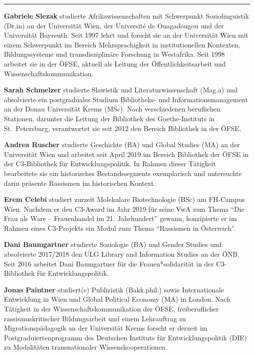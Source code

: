 \begin{center}\rule{0.5\linewidth}{0.5pt}\end{center}

\textbf{Gabriele Slezak} studierte Afrikawissenschaften mit Schwerpunkt
Soziolinguistik (Dr.in) an der Universität Wien, der Université de
Ouagadougou und der Universität Bayreuth. Seit 1997 lehrt und forscht
sie an der Universität Wien mit einem Schwerpunkt im Bereich
Mehrsprachigkeit in institutionellen Kontexten, Bildungssysteme und
transdisziplinäre Forschung in Westafrika. Seit 1998 arbeitet sie in der
ÖFSE, aktuell als Leitung der Öffentlichkeitsarbeit und
Wissenschaftskommunikation.

\textbf{Sarah Schmelzer} studierte Slawistik und Literaturwissenschaft
(Mag.a) und absolvierte ein postgraduales Studium Bibliotheks- und
Informationsmanagement an der Donau Universität Krems (MSc). Nach
verschiedenen beruflichen Stationen, darunter die Leitung der Bibliothek
des Goethe-Instituts in St.~Petersburg, verantwortet sie seit 2012 den
Bereich Bibliothek in der ÖFSE.

\textbf{Andrea Ruscher} studierte Geschichte (BA) und Global Studies
(MA) an der Universität Wien und arbeitet seit April 2019 im Bereich
Bibliothek der ÖFSE in der C3-Bibliothek für Entwicklungspolitik. In
Rahmen dieser Tätigkeit bearbeitete sie ein historisches
Bestandssegments exemplarisch und untersuchte darin präsente Rassismen
im historischen Kontext.

\textbf{Erem Celebi} studiert zurzeit Molekulare Biotechnologie (BSc) am
FH-Campus Wien. Nachdem er den C3-Award im Jahr 2019 für seine VwA zum
Thema \enquote{Die Frau als Ware -- Frauenhandel im 21. Jahrhundert} gewann,
konzipierte er im Rahmen eines C3-Projekts ein Modul zum Thema
\enquote{Rassismen in Österreich}.

\textbf{Dani Baumgartner} studierte Soziologie (BA) und Gender Studies
und absolvierte 2017/2018 den ULG Library and Information Studies an der
ÖNB. Seit 2016 arbeitet Dani Baumgartner für die Frauen*solidarität in
der C3-Bibliothek für Entwicklungspolitik.

\textbf{Jonas Paintner} studiert(e) Publizistik (Bakk.phil.) sowie
Internationale Entwicklung in Wien und Global Political Economy (MA) in
London. Nach Tätigkeit in der Wissenschaftskommunikation der ÖFSE,
freiberuflicher rassismuskritischer Bildungsarbeit und einem Lehrauftrag
zu Migrationspädagogik an der Universität Krems forscht er derzeit im
Postgraduiertenprogramm des Deutschen Instituts für Entwicklungspolitik
(DIE) zu Modalitäten transnationaler Wissenskooperationen.
